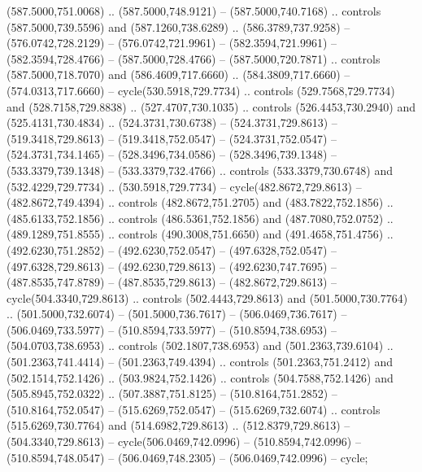       (587.5000,751.0068) .. (587.5000,748.9121) -- (587.5000,740.7168) .. controls
      (587.5000,739.5596) and (587.1260,738.6289) .. (586.3789,737.9258) --
      (576.0742,728.2129) -- (576.0742,721.9961) -- (582.3594,721.9961) --
      (582.3594,728.4766) -- (587.5000,728.4766) -- (587.5000,720.7871) .. controls
      (587.5000,718.7070) and (586.4609,717.6660) .. (584.3809,717.6660) --
      (574.0313,717.6660) -- cycle(530.5918,729.7734) .. controls
      (529.7568,729.7734) and (528.7158,729.8838) .. (527.4707,730.1035) .. controls
      (526.4453,730.2940) and (525.4131,730.4834) .. (524.3731,730.6738) --
      (524.3731,729.8613) -- (519.3418,729.8613) -- (519.3418,752.0547) --
      (524.3731,752.0547) -- (524.3731,734.1465) -- (528.3496,734.0586) --
      (528.3496,739.1348) -- (533.3379,739.1348) -- (533.3379,732.4766) .. controls
      (533.3379,730.6748) and (532.4229,729.7734) .. (530.5918,729.7734) --
      cycle(482.8672,729.8613) -- (482.8672,749.4394) .. controls
      (482.8672,751.2705) and (483.7822,752.1856) .. (485.6133,752.1856) .. controls
      (486.5361,752.1856) and (487.7080,752.0752) .. (489.1289,751.8555) .. controls
      (490.3008,751.6650) and (491.4658,751.4756) .. (492.6230,751.2852) --
      (492.6230,752.0547) -- (497.6328,752.0547) -- (497.6328,729.8613) --
      (492.6230,729.8613) -- (492.6230,747.7695) -- (487.8535,747.8789) --
      (487.8535,729.8613) -- (482.8672,729.8613) -- cycle(504.3340,729.8613) ..
      controls (502.4443,729.8613) and (501.5000,730.7764) .. (501.5000,732.6074) --
      (501.5000,736.7617) -- (506.0469,736.7617) -- (506.0469,733.5977) --
      (510.8594,733.5977) -- (510.8594,738.6953) -- (504.0703,738.6953) .. controls
      (502.1807,738.6953) and (501.2363,739.6104) .. (501.2363,741.4414) --
      (501.2363,749.4394) .. controls (501.2363,751.2412) and (502.1514,752.1426) ..
      (503.9824,752.1426) .. controls (504.7588,752.1426) and (505.8945,752.0322) ..
      (507.3887,751.8125) -- (510.8164,751.2852) -- (510.8164,752.0547) --
      (515.6269,752.0547) -- (515.6269,732.6074) .. controls (515.6269,730.7764) and
      (514.6982,729.8613) .. (512.8379,729.8613) -- (504.3340,729.8613) --
      cycle(506.0469,742.0996) -- (510.8594,742.0996) -- (510.8594,748.0547) --
      (506.0469,748.2305) -- (506.0469,742.0996) -- cycle;
